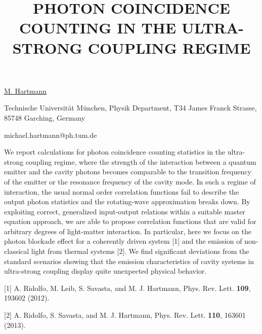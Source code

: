 \title{PHOTON COINCIDENCE COUNTING IN THE ULTRA-STRONG COUPLING REGIME}

\underline{M. Hartmann} 

{\normalsize{\vspace{-4mm}
Technische Universit\"{a}t M\"{u}nchen, Physik Department, T34 James Franck Strasse, 85748 Garching, Germany

\email michael.hartmann@ph.tum.de}}

We report calculations for photon coincidence counting statistics in the ultra-strong coupling regime, where the strength of the interaction between a quantum emitter and the cavity photons becomes comparable to the transition frequency of the emitter or the resonance frequency of the cavity mode. In such a regime of interaction, the usual normal order correlation functions fail to describe the output photon statistics and the rotating-wave approximation breaks down. By exploiting correct, generalized input-output relations within a suitable master equation approach, we are able to propose correlation functions that are valid for arbitrary degrees of light-matter interaction. In particular, here we focus on the photon blockade effect for a coherently driven system [1] and the emission of non-classical light from thermal systems [2]. We find significant deviations from the standard scenarios showing that the emission characteristics of cavity systems in ultra-strong coupling display quite unexpected physical behavior.

{\normalsize
[1] A. Ridolfo, M. Leib, S. Savasta, and M. J. Hartmann, Phys. Rev. Lett. \textbf{109}, 193602 (2012).
\vsp

[2] A. Ridolfo, S. Savasta, and M. J. Hartmann, Phys. Rev. Lett. \textbf{110}, 163601 (2013).
}

\vspace{\baselineskip}
